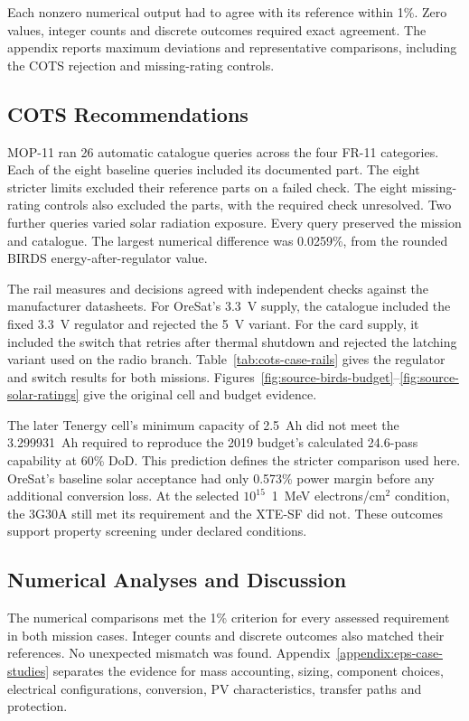 Each nonzero numerical output had to agree with its reference within 1\%.
Zero values, integer counts and discrete outcomes required exact agreement.
The appendix reports maximum deviations and representative comparisons, including the COTS rejection and missing-rating controls.

\subsection{COTS Recommendations}

MOP-11 ran 26 automatic catalogue queries across the four FR-11 categories. Each of the eight baseline queries included its documented part. The eight stricter limits excluded their reference parts on a failed check. The eight missing-rating controls also excluded the parts, with the required check unresolved. Two further queries varied solar radiation exposure. Every query preserved the mission and catalogue. The largest numerical difference was 0.0259\%, from the rounded BIRDS energy-after-regulator value.

The rail measures and decisions agreed with independent checks against the manufacturer datasheets. For OreSat's 3.3~V supply, the catalogue included the fixed 3.3~V regulator and rejected the 5~V variant. For the card supply, it included the switch that retries after thermal shutdown and rejected the latching variant used on the radio branch. Table~\ref{tab:cots-case-rails} gives the regulator and switch results for both missions. Figures~\ref{fig:source-birds-budget}--\ref{fig:source-solar-ratings} give the original cell and budget evidence.

The later Tenergy cell's minimum capacity of 2.5~Ah did not meet the 3.299931~Ah required to reproduce the 2019 budget's calculated 24.6-pass capability at 60\% DoD.
This prediction defines the stricter comparison used here.
OreSat's baseline solar acceptance had only 0.573\% power margin before any additional conversion loss.
At the selected $10^{15}$~1~MeV electrons/cm$^2$ condition, the 3G30A still met its requirement and the XTE-SF did not.
These outcomes support property screening under declared conditions.

\subsection{Numerical Analyses and Discussion}

The numerical comparisons met the 1\% criterion for every assessed requirement in both mission cases.
Integer counts and discrete outcomes also matched their references.
No unexpected mismatch was found.
Appendix~\ref{appendix:eps-case-studies} separates the evidence for mass accounting, sizing, component choices, electrical configurations, conversion, PV characteristics, transfer paths and protection.

